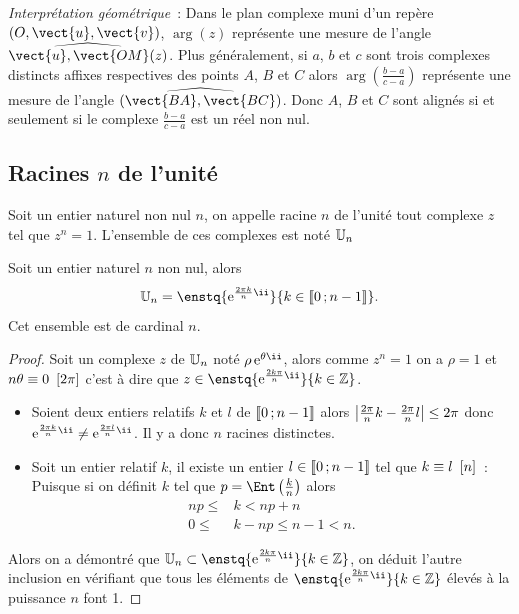 \emph{Interprétation géométrique}~: Dans le plan complexe muni d'un repère $(O,\vect{u}, \vect{v})$, $\arg(z)$ représente une mesure de l'angle $\widehat{\vect{u}, \vect{OM}(z)}$. Plus généralement, si $a$, $b$ et $c$ sont trois complexes distincts affixes respectives des points $A$, $B$ et $C$ alors $\arg\left(\frac{b-a}{c-a}\right)$ représente une mesure de l'angle $(\widehat{\vect{BA},\vect{BC}})$. Donc $A$, $B$ et $C$ sont alignés si et seulement si le complexe $\frac{b-a}{c-a}$ est un réel non nul.
%
\subsection{Racines $n$\iemes{} de l'unité}
\label{subsec:racineunite}
\begin{defdef}
  Soit un entier naturel non nul $n$, on appelle racine $n$\iemes{} de l'unité tout complexe $z$ tel que $z^n=1$. L'ensemble de ces complexes est noté $\mathbb{U}_n$
\end{defdef}
\begin{prop}
  Soit un entier naturel $n$ non nul, alors 
  \begin{equation}
    \U_n=\enstq{\expc{}{\frac{2 \pi k}{n}}}{k\in\intervalleentier{0}{n-1}}.
  \end{equation}
  Cet ensemble est de cardinal $n$.
\end{prop}
\begin{proof}
  Soit un complexe $z$ de $\mathbb{U}_n$ noté $\expc{\rho}{\theta}$, alors comme $z^n=1$ on a $\rho=1$ et $n\theta \equiv 0~\left[2\pi \right]$ c'est à dire que $z \in \enstq{\expc{}{\frac{2k\pi}{n}}}{k \in \Z}$.
  \begin{itemize}
  \item Soient deux entiers relatifs $k$ et $l$ de $\mathopen{\llbracket}0\mathclose{}\mathpunct{};n-1\mathclose{\rrbracket}$ alors $\left\lvert\frac{2\pi}{n}k - \frac{2\pi}{n}l\right\rvert \leq 2\pi$ donc $\expc{}{\frac{2\pi k}{n}} \neq \expc{}{\frac{2\pi l}{n}}$. Il y a donc $n$ racines distinctes. 
  \item Soit un entier relatif $k$, il existe un entier $l \in \mathopen{\llbracket}0\mathclose{}\mathpunct{};n-1\mathclose{\rrbracket}$ tel que $k \equiv l~\left[n \right]$~:    
      Puisque si on définit $k$ tel que $p=\Ent\left( \frac{k}{n} \right)$ alors 
      \begin{align}
        np \leq & k < np +n \\ 
        0 \leq & k-np \leq n-1 <n.
      \end{align}     
    \end{itemize}
    Alors on a démontré que $\U_n \subset \enstq{\expc{}{\frac{2k\pi}{n}}}{k \in \Z}$, on déduit l'autre inclusion en vérifiant que tous les éléments de $\enstq{\expc{}{\frac{2k\pi}{n}}}{k \in \Z}$ élevés à la puissance $n$ font 1. 
\end{proof}

